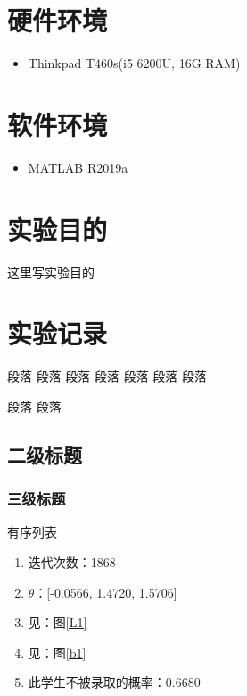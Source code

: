 \documentclass{sdureport}
\begin{document}
\begin{sduDocument}	

	\section{硬件环境}
	\begin{itemize}[leftmargin=1em] 
		\item Thinkpad T460s(i5 6200U, 16G RAM)
	\end{itemize}

	\section{软件环境}
	\begin{itemize}[leftmargin=1em] 
		\item MATLAB R2019a
	\end{itemize}
	
	\section{实验目的}
	这里写实验目的
	\section{实验记录}
	段落	段落	段落	段落	段落	段落
	段落	
	
	

	段落	段落
	\subsection{二级标题}
	\subsubsection{三级标题}
	
	有序列表		
	\begin{enumerate}
		\item 迭代次数：1868
		\item $\theta$：[-0.0566, 1.4720, 1.5706]
		\item 见：图\ref{L1}
		\item 见：图\ref{b1}
		\item 此学生不被录取的概率：0.6680
	\end{enumerate}


\end{sduDocument}
\end{document}
